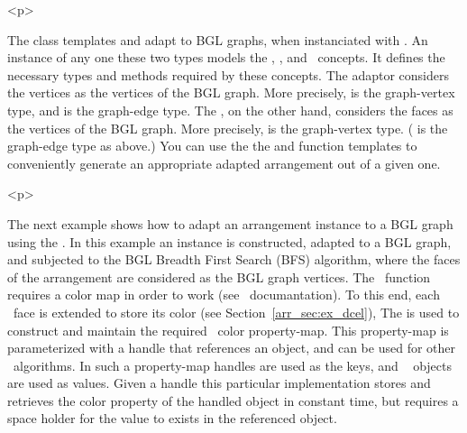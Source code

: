 \begin{ccHtmlOnly}<p>\end{ccHtmlOnly}
The class templates  and
 adapt  to BGL 
graphs, when instanciated with . An instance of any one
these two types models the , , and 
 \boost\ concepts. It defines the necessary types and 
methods required by these concepts. The  adaptor 
considers the  vertices as the vertices of the BGL graph. 
More precisely,  is the graph-vertex type,
and  is the graph-edge type. 
The , on the other hand, considers the 
 faces as the vertices of the BGL graph. More precisely, 
 is the graph-vertex type.
( is the graph-edge type as above.)
You can use the the  and
 function templates
to conveniently generate an appropriate adapted arrangement out of a given 
one.

\begin{ccHtmlOnly}<p>\end{ccHtmlOnly}
The next example shows how to adapt an arrangement instance to a BGL
graph using the . In this example an 
 instance is constructed, adapted to a BGL graph, and
subjected to the BGL Breadth First Search (BFS) algorithm, where the faces
of the arrangement are considered as the BGL graph vertices. The 
 \boost\ function requires a color map in order 
to work (see \boost\ documantation). To this end, each \dcel\ face is 
extended to store its color (see Section~\ref{arr_sec:ex_dcel}), 
The  is used to construct and maintain the required 
\boost\ color property-map. This property-map is parameterized with a
handle that references an object, and can be used for other \boost\ algorithms. 
In such a property-map handles are used as the keys, and 
\boost\  objects are used as values. Given a handle this
particular implementation stores and retrieves the color property of the 
handled object in constant time, but requires a space holder for the value
to exists in the referenced object. 


